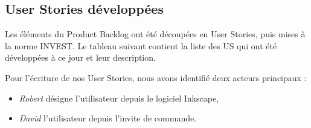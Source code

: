 \begin{table}[h!]
\centering
\caption{Product Backlog actuel}
\label{my-label}
\end{table}



\newpage
\subsection{User Stories développées}

Les éléments du Product Backlog ont été découpées en User Stories, puis mises à la norme INVEST. Le tableau suivant contient la liste des US qui ont été développées à ce jour et leur description.

Pour l'écriture de nos User Stories, nous avons identifié deux acteurs principaux : 
\begin{itemize}
    \item \textit{Robert} désigne l'utilisateur depuis le logiciel Inkscape,
    \item \textit{David} l'utilisateur depuis l'invite de commande.
\end{itemize} 

